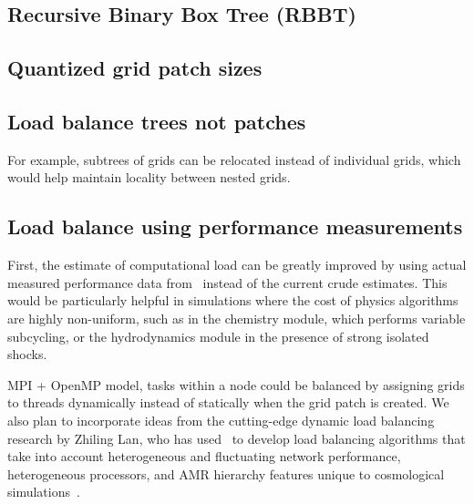 \documentclass{article}
\begin{document}
\subsection{Recursive Binary Box Tree (RBBT)}  \label{solution:amr-boxtree}



\subsection{Quantized grid patch sizes} \label{solution:amr-grid-quantized}



\subsection{Load balance trees not patches} \label{solution:amr-balance-trees}

For example, subtrees of grids can be relocated instead of individual
grids, which would help maintain locality between nested grids.

\subsection{Load balance using performance measurements}  \label{solution:amr-balance-performance}

First, the estimate of computational load can be
greatly improved by using actual measured performance data from
\lcaperf\ instead of the current crude estimates.  This would be
particularly helpful in simulations where the cost of physics
algorithms are highly non-uniform, such as in the chemistry module,
which performs variable subcycling, or the hydrodynamics module in the
presence of strong isolated shocks.  

MPI + OpenMP model, tasks within a node could be balanced by assigning
grids to threads dynamically instead of statically when the grid patch
is created.  We also plan to incorporate ideas from the cutting-edge
dynamic load balancing research by Zhiling Lan, who has used \enzo\ to
develop load balancing algorithms that take into account heterogeneous
and fluctuating network performance, heterogeneous processors, and AMR
hierarchy features unique to cosmological simulations~\cite{LaTa06}.
\end{document}
